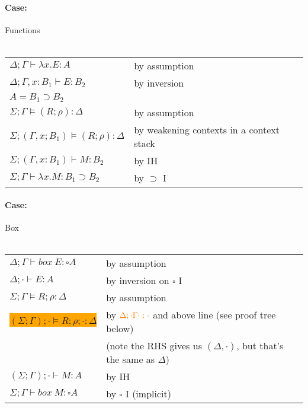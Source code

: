\documentclass[12 pt]{article}
\begin{document}
        \paragraph{Case:} Functions
        \\ 
        \DP
        \\
        \begin{tabular}{l l}
          $\Delta; \Gamma \vdash \lambda x. E : A$& by assumption
          \\ $\Delta; \Gamma, x : B_1 \vdash E : B_2$ & by inversion
          \\ $A = B_1 \supset B_2$
          \\ $\Sigma; \Gamma \models (R; \rho) : \Delta$ & by assumption
          \\ $\Sigma; (\Gamma, x ; B_1) \models (R; \rho) : \Delta$ & by weakening contexts in a context stack
          \\ $\Sigma; (\Gamma, x : B_1) \vdash M : B_2$ & by IH
          \\ $\Sigma; \Gamma \vdash \lambda x. M : B_1 \supset B_2$ & by $\supset$ I
        \end{tabular}
        \paragraph{Case:} Box
        \\ 
        \DP
        \\
        \begin{tabular}{l l}
          $\Delta; \Gamma \vdash box\ E : \square A$& by assumption
          \\ $\Delta; \cdot \vdash E : A$ & by inversion on $\square$ I
          \\ $\Sigma; \Gamma \models R; \rho : \Delta$ & by assumption
          \\ \colorbox{orange}{$(\Sigma; \Gamma); \cdot \models R; \rho ; \cdot : \Delta$} & by $\textcolor{orange}{\Delta ; \cdot \Gamma \cdot : \cdot}$ and above line (see proof tree below) \\ & (note the RHS gives us $(\Delta, \cdot)$, but that's the same as $\Delta$)
          \\ $(\Sigma; \Gamma); \cdot \vdash M : A$ & by IH
          \\ $\Sigma; \Gamma \vdash box\ M : \square A$ & by $\square$ I (implicit)
        \end{tabular}
      \begin{prooftree}
      \end{prooftree}
\end{document}
